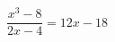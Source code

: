 \begin{ex}[type=equation]
	\begin{condition}
		$\dfrac{x^3 - 8}{2x - 4} = 12 x -18$
	\end{condition}
\end{ex}